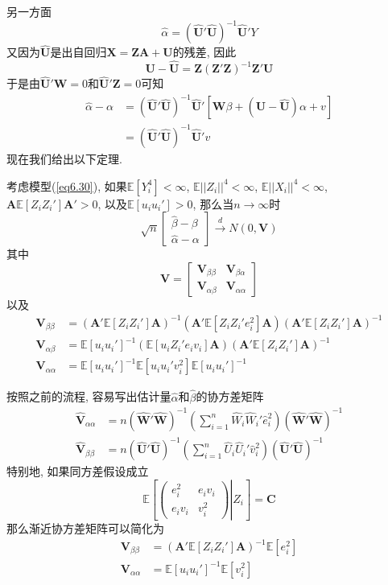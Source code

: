 \documentclass[cn, 12pt, math=mtpro2, bibstyle=apa, blue, twocol]{elegantbook}
\newcommand{\E}{\mathbb{E}}
\newcommand{\X}{\mathbold{X}}
\newcommand{\Z}{\mathbold{Z}}
\newcommand{\hb}{\hat{\beta}}
\newcommand{\V}{\mathbold{V}}
\newcommand{\A}{\mathbold{A}}
\begin{document}
另一方面
$$\hat{\alpha}=(\hat{\mathbold{U}}'\hat{\mathbold{U}})^{-1}\hat{\mathbold{U}}'Y$$
又因为$\hat{\mathbold{U}}$是出自回归$\X=\Z\A+\mathbold{U}$的残差, 因此
$$\mathbold{U}-\hat{\mathbold{U}}=\Z(\Z'\Z)^{-1}\Z'\mathbold{U}$$
于是由$\hat{\mathbold{U}}'\mathbold{W}=0$和$\hat{\mathbold{U}}'\Z=0$可知
\begin{align*}
\hat{\alpha}-\alpha&=(\hat{\mathbold{U}}'\hat{\mathbold{U}})^{-1}\hat{\mathbold{U}}'[\mathbold{W}\beta+(\mathbold{U}-\hat{\mathbold{U}})\alpha+v] \\
&=(\hat{\mathbold{U}}'\hat{\mathbold{U}})^{-1}\hat{\mathbold{U}}'v
\end{align*}
现在我们给出以下定理.
\begin{theorem}\label{thm:thm6.1}
  考虑模型(\ref{eq6.30}), 如果$\E[Y_i^4]<\infty$, $\E||Z_i||^4<\infty$, $\E||X_i||^4<\infty$, $\A\E[Z_iZ_i']\A'>0$, 以及$\E[u_iu_i']>0$, 那么当$n\to\infty$时
  \begin{equation*}\label{eq6.31}
    \sqrt{n}\begin{bmatrix}
              \hb-\beta \\
              \hat{\alpha}-\alpha
            \end{bmatrix}\xrightarrow{d}N(0,\V)
  \end{equation*}
  其中
  $$\V=\begin{bmatrix}
         \V_{\beta\beta} & \V_{\beta\alpha} \\
         \V_{\alpha\beta} & \V_{\alpha\alpha}
       \end{bmatrix}$$
  以及
  \begin{align*}
  \V_{\beta\beta}&=(\A'\E[Z_iZ_i']\A)^{-1}(\A'\E[Z_iZ_i'e_i^2]\A)(\A'\E[Z_iZ_i']\A)^{-1} \\
  \V_{\alpha\beta}&=\E[u_iu_i']^{-1}(\E[u_iZ_i'e_iv_i]\A)(\A'\E[Z_iZ_i']\A)^{-1} \\
  \V_{\alpha\alpha}&=\E[u_iu_i']^{-1}\E[u_iu_i'v_i^2]\E[u_iu_i']^{-1}
  \end{align*}
\end{theorem}
按照之前的流程, 容易写出估计量$\hat{\alpha}$和$\hat{\beta}$的协方差矩阵
\begin{align*}
\hat{\V}_{\alpha\alpha}&=n(\hat{\mathbold{W}}'\hat{\mathbold{W}})^{-1}\left(\sum_{i=1}^{n}\hat{W}_i\hat{W}_i'\hat{e}_i^2\right)(\hat{\mathbold{W}}'\hat{\mathbold{W}})^{-1} \\
\hat{\V}_{\beta\beta}&=n(\hat{\mathbold{U}}'\hat{\mathbold{U}})^{-1}\left(\sum_{i=1}^{n}\hat{U}_i\hat{U}_i'\hat{v}_i^2\right)(\hat{\mathbold{U}}'\hat{\mathbold{U}})^{-1}
\end{align*}
特别地, 如果同方差假设成立
$$\E\left[\left.\begin{pmatrix}
            e_i^2 & e_iv_i \\
            e_iv_i & v_i^2
          \end{pmatrix}\right|Z_i\right]=\mathbold{C}$$
那么渐近协方差矩阵可以简化为
\begin{align*}
\V_{\beta\beta}&=(\A'\E[Z_iZ_i']\A)^{-1}\E[e_i^2] \\
\V_{\alpha\alpha}&=\E[u_iu_i']^{-1}\E[v_i^2]
\end{align*}
\end{document}
